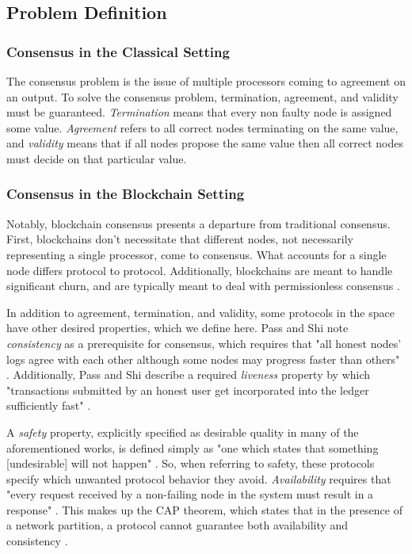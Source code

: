 \documentclass[10pt,journal,compsoc]{IEEEtran}
\begin{document}
\subsection{Problem Definition}

  
\subsubsection{Consensus in the Classical Setting}

The consensus problem is the issue of multiple processors coming to agreement on an output.\cite{AttiyaWelch} To solve the consensus problem, termination, agreement, and validity must be guaranteed. \emph{Termination} means that every non faulty node is assigned some value. \emph{Agreement} refers to all correct nodes terminating on the same value, and \emph{validity} means that if all nodes propose the same value then all correct nodes must decide on that particular value. %

\subsubsection{Consensus in the Blockchain Setting}
Notably, blockchain consensus presents a departure from traditional consensus. First, blockchains don't necessitate that different nodes, not necessarily representing a single processor, come to consensus. What accounts for a single node differs protocol to protocol. Additionally, blockchains are meant to handle significant churn, and are typically meant to deal with permissionless consensus \cite{Rethinking}.

In addition to agreement, termination, and validity, some protocols in the space have other desired properties, which we define here. Pass and Shi note \emph{consistency} as a prerequisite for consensus, which requires that "all honest nodes’ logs agree with each other although some nodes may progress faster than others" \cite{Rethinking}. Additionally, Pass and Shi describe a required \emph{liveness} property by which "transactions submitted by an honest user get incorporated into the ledger sufficiently fast" \cite{fruitchains}.

A \emph{safety} property, explicitly specified as desirable quality in many of the aforementioned works, is defined simply as "one which states that something [undesirable] will not happen" \cite{LamportMultiprocess}. So, when referring to safety, these protocols specify which unwanted protocol behavior they avoid. \emph{Availability} requires that "every request received by a non-failing node in the system must result in a response" \cite{GilbertLynch}. This makes up the CAP theorem, which states that in the presence of a network partition, a protocol cannot guarantee both availability and consistency \cite{GilbertLynch}.
\end{document}
